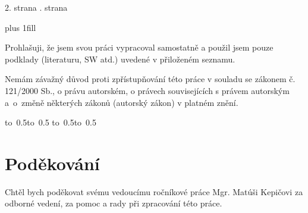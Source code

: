 
\pagestyle{empty}
\hypersetup{pageanchor=false}

\maketitle

\openright
\hypersetup{pageanchor=true}
\pagestyle{plain}

2. strana
. strana
\newpage


\vglue 0pt plus 1fill


\noindent
Prohlašuji, že jsem svou práci vypracoval samostatně a použil jsem pouze podklady (literaturu, SW atd.) uvedené v přiloženém seznamu.

\medskip\noindent
Nemám závažný důvod proti zpřístupňování této práce v souladu se zákonem č. 121/2000 Sb., o právu autorském, o právech souvisejících s právem autorským a~o~změně některých zákonů (autorský zákon) v platném znění.

\vspace{10mm}

\hbox{\hbox to 0.5\hbox to 0.5\hsize{\dotfill\quad}}
\smallskip
\hbox{\hbox to 0.5\hsize{}\hbox to 0.5}

\vspace{20mm}
\newpage

\openright

\noindent %
\section*{Poděkování}
Chtěl bych poděkovat svému vedoucímu ročníkové práce Mgr. Matúši Kepičovi za odborné vedení, za pomoc a rady při zpracování této práce.


\tableofcontents

\openright
\pagestyle{plain}
\setcounter{page}{6}